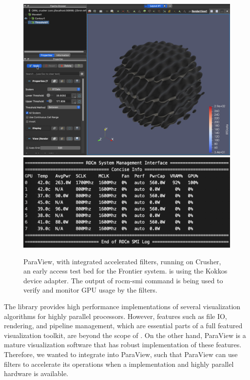 \begin{figure}[htb]
  \includegraphics[width=\linewidth]{figures/paraview-crusher.png}
  \includegraphics[width=\linewidth]{figures/threshold-vtkm-gpu-usage-crusher-small.png}
  \caption{
    ParaView, with integrated \vtkm accelerated filters, running on Crusher, an early access test bed for the Frontier system.
    \vtkm is using the Kokkos device adapter.
    The output of rocm-smi command is being used to verify and monitor GPU usage by the filters.
  }
  \label{fig:paraview-crusher}
\end{figure}

The \vtkm library provides high performance implementations of several visualization algorithms for highly parallel processors. However, features such as file IO, rendering, and pipeline management, which are essential parts of a full featured visualization toolkit, are beyond the scope of \vtkm. On the other hand, ParaView is a mature visualization software that has robust implementation of these features. Therefore, we wanted to integrate \vtkm into ParaView, such that ParaView can use \vtkm filters to accelerate its operations when a \vtkm implementation and highly parallel hardware is available.

